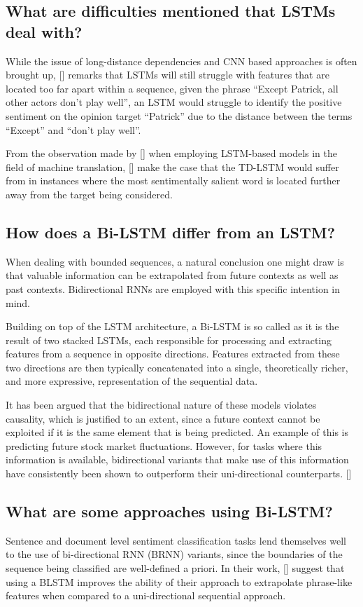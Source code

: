 \documentclass[12pt, a4paper]{report}
\theoremstyle{definition}
\theoremstyle{definition}%
\theoremstyle{definition}%
\theoremstyle{definition}%
\theoremstyle{definition}%
\theoremstyle{definition}%
\renewcommand{\cite}[1]{[\citealp{#1}]}
\begin{document}
\subsection{What are difficulties mentioned that LSTMs deal with?}
While the issue of long-distance dependencies and CNN based approaches is often brought up, \cite{chen2017} remarks that LSTMs will still struggle with features that are located too far apart within a sequence, given the phrase \enquote{Except Patrick, all other actors don’t play well}, an LSTM would struggle to identify the positive sentiment on the opinion target \enquote{Patrick} due to the distance between the terms \enquote{Except} and \enquote{don't play well}.

From the observation made by \cite{bahdanau2014} when employing LSTM-based models in the field of machine translation, \cite{chen2017} make the case that the TD-LSTM would suffer from in instances where the most sentimentally salient word is located further away from the target being considered. 

\subsection{How does a Bi-LSTM differ from an LSTM?}
When dealing with bounded sequences, a natural conclusion one  might draw is that valuable information can be extrapolated from future contexts as well as past contexts. Bidirectional RNNs are employed with this specific intention in mind. 

Building on top of the LSTM architecture, a Bi-LSTM is so called as it is the result of two stacked LSTMs, each responsible for processing and extracting features from a sequence in opposite directions. Features extracted from these two directions are then typically concatenated into a single, theoretically richer, and more expressive, representation of the sequential data.

It has been argued that the bidirectional nature of these models violates causality, which is justified to an extent, since a future context cannot be exploited if it is the same element that is being predicted. An example of this is predicting future stock market fluctuations. However, for tasks where this information is available, bidirectional variants that make use of this information have consistently been shown to outperform their uni-directional counterparts. \cite{graves2012b} 

\subsection{What are some approaches using Bi-LSTM?}
Sentence and document level sentiment classification tasks lend themselves well to the use of bi-directional RNN (BRNN) variants, since the boundaries of the sequence being classified are well-defined a priori. In their work, \cite{chen2017} suggest that using a BLSTM improves the ability of their approach to extrapolate phrase-like features when compared to a uni-directional sequential approach. 
\end{document}
